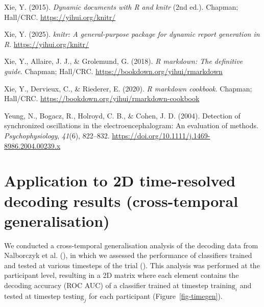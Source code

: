 \documentclass[
  doc,
  floatsintext,
  longtable,
  a4paper,
  nolmodern,
  notxfonts,
  notimes,
  colorlinks=true,linkcolor=blue,citecolor=blue,urlcolor=blue]{apa7}
\newlength{\cslhangindent}
\newenvironment{CSLReferences}[2] %
 {\begin{list}{}{%
  \setlength{\itemindent}{0pt}
  \setlength{\leftmargin}{0pt}
  \setlength{\parsep}{0pt}
  \ifodd #1
   \setlength{\leftmargin}{\cslhangindent}
   \setlength{\itemindent}{-1\cslhangindent}
  \fi
  \setlength{\itemsep}{#2\baselineskip}}}
 {\end{list}}
\begin{document}
\begin{CSLReferences}{1}{0}
Xie, Y. (2015). \emph{Dynamic documents with {R} and knitr} (2nd ed.).
Chapman; Hall/CRC. \url{https://yihui.org/knitr/}

Xie, Y. (2025). \emph{{knitr}: A general-purpose package for dynamic
report generation in {R}}. \url{https://yihui.org/knitr/}

Xie, Y., Allaire, J. J., \& Grolemund, G. (2018). \emph{R markdown: The
definitive guide}. Chapman; Hall/CRC.
\url{https://bookdown.org/yihui/rmarkdown}

Xie, Y., Dervieux, C., \& Riederer, E. (2020). \emph{R markdown
cookbook}. Chapman; Hall/CRC.
\url{https://bookdown.org/yihui/rmarkdown-cookbook}

Yeung, N., Bogacz, R., Holroyd, C. B., \& Cohen, J. D. (2004). Detection
of synchronized oscillations in the electroencephalogram: An evaluation
of methods. \emph{Psychophysiology}, \emph{41}(6), 822--832.
\url{https://doi.org/10.1111/j.1469-8986.2004.00239.x}

\end{CSLReferences}

\newpage

\appendix

\section{Application to 2D time-resolved decoding results
(cross-temporal generalisation)}\label{apx-2D}

\setlength{\parindent}{0pt}
\setlength{\parskip}{6pt}

We conducted a cross-temporal generalisation analysis of the decoding
data from Nalborczyk et al. (), in which we assessed the performance of classifiers
trained and tested at various timesteps of the trial
(). This analysis was
performed at the participant level, resulting in a 2D matrix where each
element contains the decoding accuracy (ROC AUC) of a classifier trained
at timestep \(\text{training}_{i}\) and tested at timestep
\(\text{testing}_{j}\) for each participant (Figure~\ref{fig-timegen}).
\end{document}
